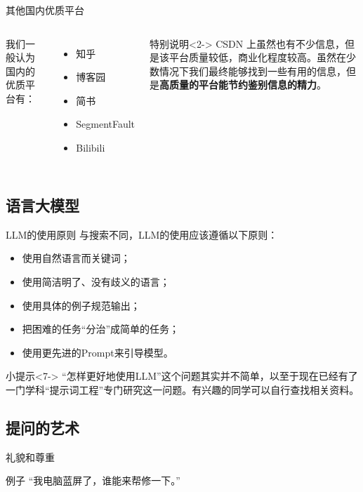 \documentclass{beamer}
\begin{document}
\begin{frame}{其他国内优质平台}
    \begin{columns}[T]
            我们一般认为国内的优质平台有：
            \begin{itemize}
                \item 知乎
                \item 博客园
                \item 简书
                \item SegmentFault
                \item Bilibili
            \end{itemize}
            \begin{alertblock}{特别说明}<2->
                CSDN 上虽然也有不少信息，但是该平台质量较低，商业化程度较高。虽然在少数情况下我们最终能够找到一些有用的信息，但是\textbf{高质量的平台能节约鉴别信息的精力}。
            \end{alertblock}
    \end{columns}    
\end{frame}

\subsection{语言大模型}
\begin{frame}{LLM的使用原则}
    与搜索不同，LLM的使用应该遵循以下原则：
    \begin{itemize}
        \item <2->使用自然语言而关键词；
        \item <3->使用简洁明了、没有歧义的语言；
        \item <4->使用具体的例子规范输出；
        \item <5->把困难的任务“分治”成简单的任务；
        \item <6->使用更先进的Prompt来引导模型。
    \end{itemize}
    \begin{block}{小提示}<7->
        “怎样更好地使用LLM”这个问题其实并不简单，以至于现在已经有了一门学科“提示词工程”专门研究这一问题。有兴趣的同学可以自行查找相关资料。
    \end{block}
\end{frame}

\subsection{提问的艺术}
\begin{frame}{礼貌和尊重}
    \begin{exampleblock}{例子}
        “我电脑蓝屏了，谁能来帮修一下。”
    \end{exampleblock}

\end{frame}
\end{document}
